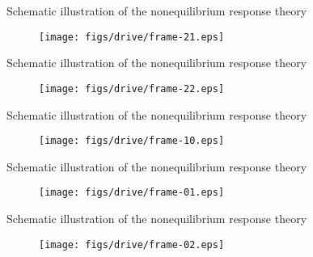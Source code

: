 \documentclass[fleqn]{beamer}
\begin{document}
\begin{frame}{Schematic illustration of the nonequilibrium response theory}
  \addtocounter{framenumber}{-1}
  \begin{figure}
    \texttt{[image: figs/drive/frame-21.eps]}
  \end{figure}  
\end{frame}

\begin{frame}{Schematic illustration of the nonequilibrium response theory}
  \addtocounter{framenumber}{-1}
  \begin{figure}
    \texttt{[image: figs/drive/frame-22.eps]}
  \end{figure}  
\end{frame}

\begin{frame}{Schematic illustration of the nonequilibrium response theory}
  \addtocounter{framenumber}{-1}
  \begin{figure}
    \texttt{[image: figs/drive/frame-10.eps]}
  \end{figure}  
\end{frame}

\begin{frame}{Schematic illustration of the nonequilibrium response theory}
  \addtocounter{framenumber}{-1}
  \begin{figure}
    \texttt{[image: figs/drive/frame-01.eps]}
  \end{figure}  
\end{frame}

\begin{frame}{Schematic illustration of the nonequilibrium response theory}
  \addtocounter{framenumber}{-1}
  \begin{figure}
    \texttt{[image: figs/drive/frame-02.eps]}
  \end{figure}  
\end{frame}
\end{document}
